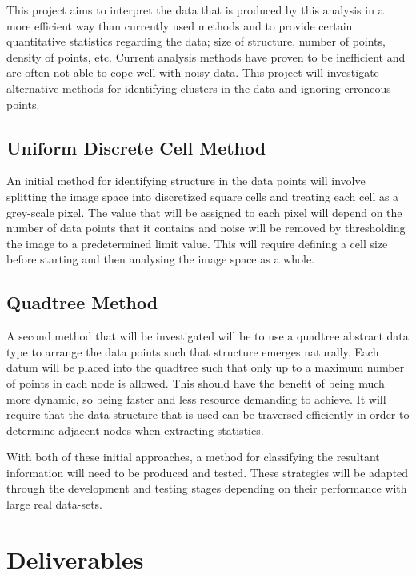 This project aims to interpret the data that is produced by this analysis in a
more efficient way than currently used methods and to provide certain
quantitative statistics regarding the data; size of structure, number of
points, density of points, etc. Current analysis methods have proven to be
inefficient and are often not able to cope well with noisy data. This project
will investigate alternative methods for identifying clusters in the data and
ignoring erroneous points.

\subsection{Uniform Discrete Cell Method}
\label{sub:uniform_discrete_cell_method}

An initial method for identifying structure in the data points will involve
splitting the image space into discretized square cells and treating each cell
as a grey-scale pixel. The value that will be assigned to each pixel will
depend on the number of data points that it contains and noise will be removed
by thresholding the image to a predetermined limit value. This will require
defining a cell size before starting and then analysing the image space as a
whole.

\subsection{Quadtree Method}
\label{sub:quadtree_method}

A second method that will be investigated will be to use a quadtree abstract
data type to arrange the data points such that structure emerges naturally.
Each datum will be placed into the quadtree such that only up to a maximum
number of points in each node is allowed. This should have the benefit of being
much more dynamic, so being faster and less resource demanding to achieve. It
will require that the data structure that is used can be traversed efficiently
in order to determine adjacent nodes when extracting statistics.

With both of these initial approaches, a method for classifying the resultant
information will need to be produced and tested. These strategies will be
adapted through the development and testing stages depending on their
performance with large real data-sets.

\section{Deliverables}
\label{sec:deliverables}

